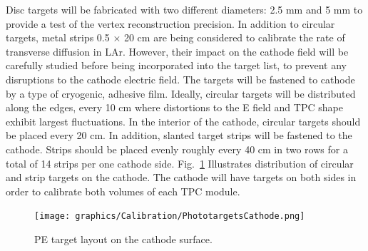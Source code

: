 \begin{itemize}
\begin{itemize}
        Disc targets will be fabricated with two different diameters: 2.5 mm and 5 mm to provide a test of the vertex reconstruction precision. In addition to circular targets, metal strips 0.5 × 20 cm are being considered to calibrate the rate of transverse diffusion in LAr. However, their impact on the cathode field will be carefully studied before being incorporated into the target list, to prevent any disruptions to the cathode electric field. The targets will be fastened to cathode by a type of cryogenic, adhesive film. Ideally, circular targets will be distributed along the edges, every 10 cm where distortions to the E field and TPC shape exhibit largest fluctuations. In the interior of the cathode, circular targets should be placed every 20 cm. In addition, slanted target strips will be fastened to the cathode. Strips should be placed evenly roughly every 40 cm in two rows for a total of 14 strips per one cathode side.  Fig.~\ref{fig:target_layout} Illustrates distribution of circular and strip targets on the cathode. The cathode will have targets on both sides in order to calibrate both volumes of each TPC module. 
        
\begin{figure}[htbp]
\centering 
\texttt{[image: graphics/Calibration/PhototargetsCathode.png]}
\caption{\label{fig:target_layout} PE target layout on the cathode surface.}
\end{figure}


\end{itemize}
\end{itemize}
